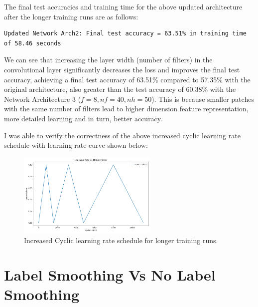 \documentclass[11pt]{article}
\begin{document}
The final test accuracies and training time for the above updated architecture after the longer training runs are as follows:
\begin{lstlisting}[caption={Final test accuracy and training time for updated Arch2 longer training runs}, label={lst:longer_training_runs_accuracies}]
Updated Network Arch2: Final test accuracy = 63.51% in training time of 58.46 seconds
\end{lstlisting}

We can see that increasing the layer width (number of filters) in the convolutional layer significantly decreases the loss and improves the final test accuracy, achieving a final test accuracy of 63.51\% compared to 57.35\% with the original architecture, also greater than the test accuracy of 60.38\% with the Network Architecture 3 ($f=8, nf=40, nh=50$). This is because smaller patches with the same number of filters lead to higher dimension feature representation, more detailed learning and in turn, better accuracy. 

I was able to verify the correctness of the above increased cyclic learning rate schedule with learning rate curve shown below:

\begin{figure}[H]
  \centering
  \includegraphics[width=0.6\textwidth]{results/architecture_4_learning_rate_plot.png}
  \caption{Increased Cyclic learning rate schedule for longer training runs.}
  \label{fig:increased_cyclic_learning_rate}
\end{figure}

\section*{Label Smoothing Vs No Label Smoothing}
\end{document}
